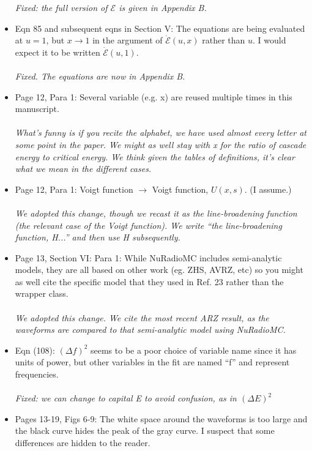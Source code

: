 \documentclass[12pt]{article}
\begin{document}
\begin{itemize}
\textit{Fixed: the full version of $\mathcal{E}$ is given in Appendix B.}
\item Eqn 85 and subsequent eqns in Section V: The equations are being evaluated at $u=1$, but $x \rightarrow 1$ in the argument of $\mathcal{\dot{E}}(u,x)$ rather than $u$. I would expect it to be written $\mathcal{\dot{E}}(u,1)$. \\ \\
\textit{Fixed.  The equations are now in Appendix B.}
\item Page 12, Para 1: Several variable (e.g. x) are reused multiple times in this manuscript. \\ \\
\textit{What's funny is if you recite the alphabet, we have used almost every letter at some point in the paper.  We might as well stay with x for the ratio of cascade energy to critical energy.  We think given the tables of definitions, it's clear what we mean in the different cases.}
\item Page 12, Para 1: Voigt function $\rightarrow$ Voigt function, $U(x,s)$. (I assume.) \\ \\
\textit{We adopted this change, though we recast it as the line-broadening function (the relevant case of the Voigt function).  We write ``the line-broadening function, H...'' and then use H subsequently.}
\item Page 13, Section VI: Para 1: While NuRadioMC includes semi-analytic models, they are all based on other work (eg. ZHS, AVRZ, etc) so you might as well cite the specific model that they used in Ref. 23 rather than the wrapper class. \\ \\
\textit{We adopted this change.  We cite the most recent ARZ result, as the waveforms are compared to that semi-analytic model using NuRadioMC.}
\item Eqn (108): $(\Delta f)^2$ seems to be a poor choice of variable name since it has units of power, but other variables in the fit are named ``f'' and represent frequencies. \\ \\
\textit{Fixed: we can change to capital E to avoid confusion, as in $(\Delta E)^2$}
\item Pages 13-19, Figs 6-9: The white space around the waveforms is too large and the black curve hides the peak of the gray curve. I suspect that some differences are hidden to the reader. \\ \\ 

\end{itemize}
\end{document}
